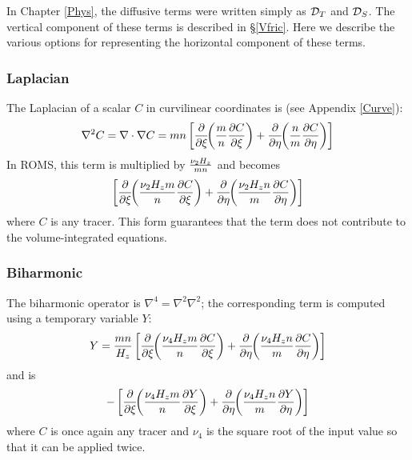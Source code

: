 In Chapter \ref{Phys}, the diffusive terms were written simply as
${\cal D}_T$ and ${\cal D}_S$. The vertical component of these terms
is described in \S\ref{Vfric}. Here we describe the various options
for representing the horizontal component of these terms.

\subsubsection{Laplacian}
The Laplacian of a scalar $C$ in curvilinear coordinates is (see
Appendix \ref{Curve}):
\begin{equation}
   \nabla^2 C = \nabla \cdot \nabla C = mn \left[ 
   {\partial \over \partial \xi} \!\! \left( {m \over n} 
   {\partial C \over \partial \xi} \right) +
   {\partial \over \partial \eta} \!\! \left( {n \over m} 
   {\partial C \over \partial \eta} \right) \right]
\end{equation}
In ROMS, this term is multiplied by ${\nu_2 H_z \over mn}$ and becomes
\begin{equation}
   \left[ 
   {\partial \over \partial \xi} \!\! \left( {\nu_2 H_zm \over n} 
   {\partial C \over \partial \xi} \right) +
   {\partial \over \partial \eta} \!\! \left( {\nu_2 H_zn \over m} 
   {\partial C \over \partial \eta} \right) \right]
\end{equation}
where $C$ is any tracer. This form guarantees
that the term does not contribute to the volume-integrated equations.

\subsubsection{Biharmonic}
The biharmonic operator is $\nabla^4 = \nabla^2 \nabla^2$; the
corresponding term is computed using a temporary variable $Y$:
\begin{equation}
   Y =
   {mn \over H_z} \left[ 
   {\partial \over \partial \xi} \!\! \left( {\nu_4 H_zm \over n} 
   {\partial C \over \partial \xi} \right) +
   {\partial \over \partial \eta} \!\! \left( {\nu_4 H_zn \over m} 
   {\partial C \over \partial \eta} \right) \right]
\end{equation}
and is
\begin{equation}
   - \left[ 
   {\partial \over \partial \xi} \!\! \left( {\nu_4 H_zm \over n} 
   {\partial Y \over \partial \xi} \right) +
   {\partial \over \partial \eta} \!\! \left( {\nu_4 H_zn \over m} 
   {\partial Y \over \partial \eta} \right) \right]
\end{equation}
where $C$ is once again any tracer and $\nu_4$ is the square root of
the input value so that it can be applied twice.

